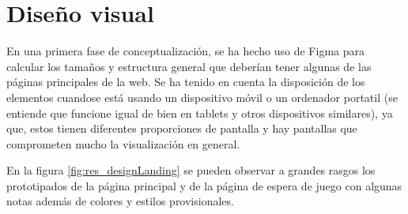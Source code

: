 \section{Diseño visual}

En una primera fase de conceptualización, se ha hecho uso de Figma \cite{figma} para calcular los tamaños y 
estructura general que deberían tener algunas de las páginas principales de la web. Se ha tenido en cuenta la disposición de los elementos cuandose está usando un dispositivo móvil o un
ordenador portatil (se entiende que funcione igual de bien en tablets y otros dispositivos similares), ya que, 
estos tienen diferentes proporciones de pantalla y hay pantallas que comprometen mucho la visualización en general.

En la figura \ref{fig:res_designLanding} se pueden observar a grandes rasgos los 
prototipados de la página principal y de la página de espera de juego con algunas notas además de colores 
y estilos provisionales.


